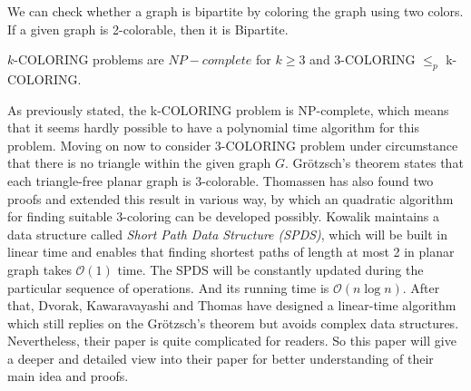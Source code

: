 \begin{observation}
We can check whether a graph is bipartite by coloring the graph using two colors. If a given graph is 2-colorable, then it is Bipartite.
\end{observation}

\begin{observation}
$k$-COLORING problems are $NP-complete$ for $k \geq 3$ and 3-COLORING $\le_p$ k-COLORING. 
\end{observation}

As previously stated, the k-COLORING problem is NP-complete, which means that it seems hardly possible to have a polynomial time algorithm for this problem. Moving on now to consider 3-COLORING problem under circumstance that there is no triangle within the given graph $G$. Grötzsch’s theorem states that each triangle-free planar graph is 3-colorable. Thomassen \cite{Thomassen1994Grtzschs3T} has also found two proofs and extended this result in various way, by which an quadratic algorithm for finding suitable 3-coloring can be developed possibly. Kowalik \cite{article} maintains a data structure called \textit{Short Path Data Structure (SPDS)}, which will be built in linear time and enables that finding shortest paths of length at most 2 in planar graph takes $\mathcal{O}(1)$ time. The SPDS will be constantly updated during the particular sequence of operations. And its running time is $\mathcal{O}(n\log{}n)$. After that, Dvorak, Kawaravayashi and Thomas \cite{dvorak2013threecoloring} have designed a linear-time algorithm which still replies on the Grötzsch’s theorem but avoids complex data structures. Nevertheless, their paper is quite complicated for readers. So this paper will give a deeper and detailed view into their paper for better understanding of their main idea and proofs. 
